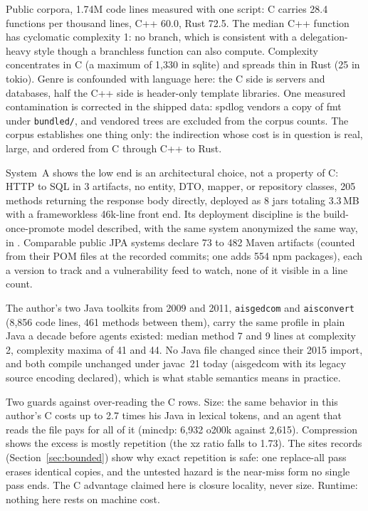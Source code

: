 \documentclass[journal]{IEEEtran}
\begin{document}
Public corpora, 1.74M code lines measured with one script: C carries 28.4
functions per thousand lines, C++ 60.0, Rust 72.5. The median C++
function has cyclomatic complexity 1: no branch, which is consistent with a
delegation-heavy style though a branchless function can also compute.
Complexity concentrates in C (a maximum of 1,330 in sqlite) and spreads thin
in Rust (25 in tokio). Genre is confounded with language here: the C side is
servers and databases, half the C++ side is header-only template libraries.
One measured contamination is corrected in the shipped data: spdlog vendors
a copy of fmt under \texttt{bundled/}, and vendored trees are excluded from
the corpus counts. The corpus establishes one thing only: the indirection whose cost is in
question is real, large, and ordered from C through C++ to Rust.

System~A shows the low end is an architectural choice, not a property of C:
HTTP to SQL in 3 artifacts, no entity, DTO, mapper, or repository classes,
205 methods returning the response body directly, deployed as 8 jars
totaling 3.3\,MB with a frameworkless 46k-line front end. Its deployment
discipline is the build-once-promote model described, with the same system
anonymized the same way, in \cite{promote}. Comparable public
JPA systems declare 73 to 482 Maven artifacts (counted from their POM files
at the recorded commits; one adds 554 npm packages), each a version to track
and a vulnerability feed to watch, none of it visible in a line count.

The author's two Java toolkits from 2009 and 2011, \texttt{aisgedcom} and
\texttt{aisconvert} \cite{aisgedcom,aisconvert} (8,856 code lines, 461
methods between them), carry the same profile in plain Java a decade before
agents existed: median method 7 and 9 lines at complexity 2, complexity
maxima of 41 and 44. No Java file changed since their 2015 import, and both
compile unchanged under javac~21 today (aisgedcom with its legacy source
encoding declared), which is what stable semantics means in practice.

Two guards against over-reading the C rows. Size: the same behavior in this
author's C costs up to 2.7 times his Java in lexical tokens, and an agent
that reads the file pays for all of it (mincdp: 6,932 o200k against 2,615). Compression
shows the excess is mostly repetition (the xz ratio falls to 1.73). The sites records
(Section~\ref{sec:bounded}) show why exact repetition is safe: one replace-all pass
erases identical copies, and the untested hazard is the near-miss form
no single pass ends. The C advantage claimed here is closure locality, never
size. Runtime: nothing here rests on machine cost.
\end{document}
